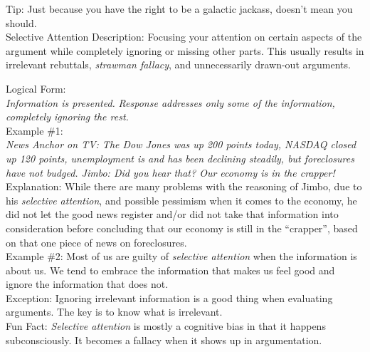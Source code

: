 \documentclass[a4paper,12pt,single,pdftex]{scrartcl}
\begin{document}
    
      Tip: Just because you have the right to be a galactic jackass, doesn’t mean you should.
    \\

  

Selective Attention
    Description: Focusing your attention on certain aspects of the argument while completely ignoring or missing other parts.  This usually results in irrelevant rebuttals, {\it strawman fallacy}, and unnecessarily drawn-out arguments.

    
      Logical Form:
    \\

    
      {\em Information is presented.} \newline
{\em Response addresses only some of the information, completely ignoring the rest.}
    \\

    
      Example \#1:
    \\

    
      {\em News Anchor on TV: The Dow Jones was up 200 points today, NASDAQ closed up 120 points, unemployment is and has been declining steadily, but foreclosures have not budged. \newline
Jimbo: Did you hear that?  Our economy is in the crapper!}
    \\

    
      Explanation: While there are many problems with the reasoning of Jimbo, due to his {\it selective attention}, and possible pessimism when it comes to the economy, he did not let the good news register and/or did not take that information into consideration before concluding that our economy is still in the “crapper”, based on that one piece of news on foreclosures.
    \\

    
      Example \#2: Most of us are guilty of {\it selective attention}  when the information is about us.  We tend to embrace the information that makes us feel good and ignore the information that does not.
    \\

    
      Exception: Ignoring irrelevant information is a good thing when evaluating arguments.  The key is to know what is irrelevant.
    \\

    
      Fun Fact: {\em Selective attention} is mostly a cognitive bias in that it happens subconsciously. It becomes a fallacy when it shows up in argumentation.
    \\
\end{document}
